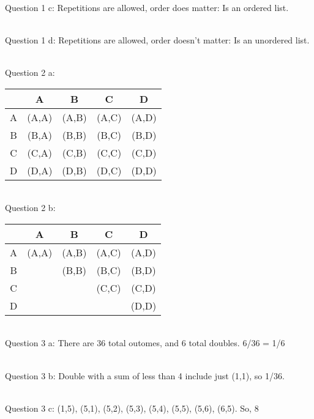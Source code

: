 {    ~\\ Question 1 c:   Repetitions are allowed, order does matter: Is an ordered list.

    ~\\ Question 1 d:   Repetitions are allowed, order doesn't matter: Is an unordered list.

    ~\\ Question 2 a:
                    \begin{center}
                        \begin{tabular}{c | c c c c}
                            & A & B & C & D \\ \hline
                            A & (A,A) & (A,B) & (A,C) & (A,D)
                            \\
                            B & (B,A) & (B,B) & (B,C) & (B,D)
                            \\
                            C & (C,A) & (C,B) & (C,C) & (C,D)
                            \\
                            D & (D,A) & (D,B) & (D,C) & (D,D)
                        \end{tabular}
                    \end{center}

    ~\\ Question 2 b:
                    \begin{center}
                        \begin{tabular}{c | c c c c}
                            & A & B & C & D \\ \hline
                            A & (A,A) & (A,B) & (A,C) & (A,D)
                            \\
                            B &  & (B,B) & (B,C) & (B,D)
                            \\
                            C &  &  & (C,C) & (C,D)
                            \\
                            D &  &  &  & (D,D)
                        \end{tabular}
                    \end{center}

    ~\\ Question 3 a:   There are 36 total outomes, and 6 total doubles. 6/36 = 1/6

    ~\\ Question 3 b:   Double with a sum of less than 4 include just (1,1), so 1/36.

    ~\\ Question 3 c:   (1,5), (5,1), (5,2), (5,3), (5,4), (5,5), (5,6), (6,5).
                        So, 8

}

